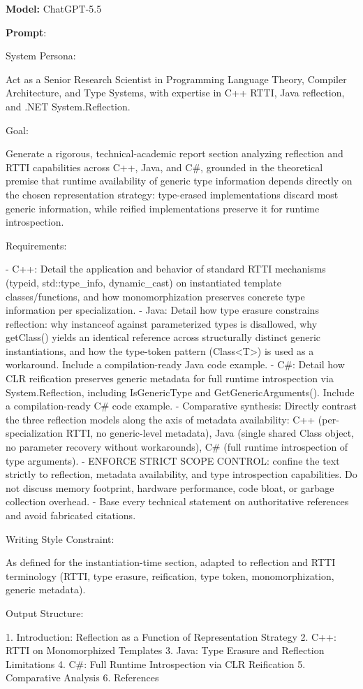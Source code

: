 \documentclass[11pt]{report}
\begin{document}
\noindent\textbf{Model:} ChatGPT-5.5

\vspace{0.5em}
\noindent\textbf{Prompt}:

\begin{PromptVerbatim}
System Persona:

Act as a Senior Research Scientist in Programming Language Theory,
Compiler Architecture, and Type Systems, with expertise in C++ RTTI, Java
reflection, and .NET System.Reflection.

Goal:

Generate a rigorous, technical-academic report section analyzing
reflection and RTTI capabilities across C++, Java, and C#, grounded in the
theoretical premise that runtime availability of generic type information
depends directly on the chosen representation strategy: type-erased
implementations discard most generic information, while reified
implementations preserve it for runtime introspection.

Requirements:

- C++: Detail the application and behavior of standard RTTI mechanisms
  (typeid, std::type_info, dynamic_cast) on instantiated template
  classes/functions, and how monomorphization preserves concrete type
  information per specialization.
- Java: Detail how type erasure constrains reflection: why instanceof
  against parameterized types is disallowed, why getClass() yields an
  identical reference across structurally distinct generic
  instantiations, and how the type-token pattern (Class<T>) is used as a
  workaround. Include a compilation-ready Java code example.
- C#: Detail how CLR reification preserves generic metadata for full
  runtime introspection via System.Reflection, including IsGenericType
  and GetGenericArguments(). Include a compilation-ready C# code example.
- Comparative synthesis: Directly contrast the three reflection models
  along the axis of metadata availability: C++ (per-specialization RTTI,
  no generic-level metadata), Java (single shared Class object, no
  parameter recovery without workarounds), C# (full runtime introspection
  of type arguments).
- ENFORCE STRICT SCOPE CONTROL: confine the text strictly to reflection,
  metadata availability, and type introspection capabilities. Do not
  discuss memory footprint, hardware performance, code bloat, or garbage
  collection overhead.
- Base every technical statement on authoritative references and avoid
  fabricated citations.

Writing Style Constraint:

As defined for the instantiation-time section, adapted to reflection and
RTTI terminology (RTTI, type erasure, reification, type token,
monomorphization, generic metadata).

Output Structure:

1. Introduction: Reflection as a Function of Representation Strategy
2. C++: RTTI on Monomorphized Templates
3. Java: Type Erasure and Reflection Limitations
4. C#: Full Runtime Introspection via CLR Reification
5. Comparative Analysis
6. References
\end{PromptVerbatim}
\end{document}
